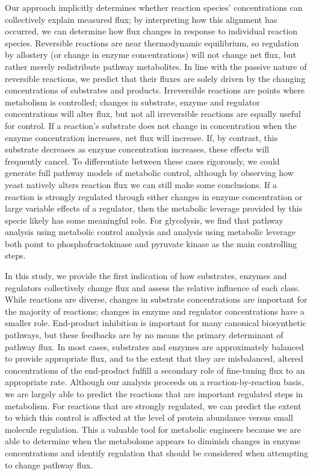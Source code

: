 Our approach implicitly determines whether reaction species' concentrations can collectively explain measured flux; by interpreting how this alignment has occurred, we can determine how flux changes in response to individual reaction species.  Reversible reactions are near thermodynamic equilibrium, so regulation by allostery (or change in enzyme concentrations) will not change net flux, but rather merely redistribute pathway metabolites.  In line with the passive nature of reversible reactions, we predict that their fluxes are solely driven by the changing concentrations of substrates and products.  Irreversible reactions are points where metabolism is controlled; changes in substrate, enzyme and regulator concentrations will alter flux, but not all irreversible reactions are equally useful for control.  If a reaction's substrate does not change in concentration when the enzyme concentration increases, net flux will increase.  If, by contrast, this substrate decreases as enzyme concentration increases, these effects will frequently cancel.  To differentiate between these cases rigorously, we could generate full pathway models of metabolic control, although by observing how yeast natively alters reaction flux we can still make some conclusions.  If a reaction is strongly regulated through either changes in enzyme concentration or large variable effects of a regulator, then the metabolic leverage provided by this specie likely has some meaningful role.  For glycolysis, we find that pathway analysis using metabolic control analysis and analysis using metabolic leverage both point to phosphofructokinase and pyruvate kinase as the main controlling steps.

In this study, we provide the first indication of how substrates, enzymes and regulators collectively change flux and assess the relative influence of each class.  While reactions are diverse, changes in substrate concentrations are important for the majority of reactions; changes in enzyme and regulator concentrations have a smaller role.  End-product inhibition is important for many canonical biosynthetic pathways, but these feedbacks are by no means the primary determinant of pathway flux.  In most cases, substrates and enzymes are approximately balanced to provide appropriate flux, and to the extent that they are misbalanced, altered concentrations of the end-product fulfill a secondary role of fine-tuning flux to an appropriate rate.  Although our analysis proceeds on a reaction-by-reaction basis, we are largely able to predict the reactions that are important regulated steps in metabolism. For reactions that are strongly regulated, we can predict the extent to which this control is affected at the level of protein abundance versus small molecule regulation.  This a valuable tool for metabolic engineers because we are able to determine when the metabolome appears to diminish changes in enzyme concentrations and identify regulation that should be considered when attempting to change pathway flux.  

